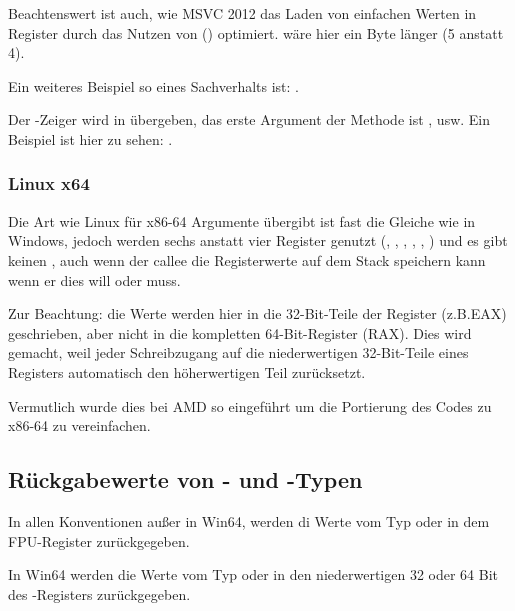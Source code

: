 Beachtenswert ist auch, wie MSVC 2012 das Laden von einfachen Werten in Register
durch das Nutzen von \LEA () optimiert.
 wäre hier ein Byte länger (5 anstatt 4).

Ein weiteres Beispiel so eines Sachverhalts ist: .


Der \ITthis-Zeiger wird in \RCX übergeben, das erste Argument der Methode ist \RDX, usw.
Ein Beispiel ist hier zu sehen: .

\subsubsection{Linux x64}

Die Art wie Linux für x86-64 Argumente übergibt ist fast die Gleiche wie in Windows,
jedoch werden sechs anstatt vier Register genutzt (\RDI, \RSI, \RDX, \RCX, , )
und es gibt keinen , auch wenn der \gls{callee} die Registerwerte auf
dem Stack speichern kann wenn er dies will oder muss.

%


Zur Beachtung: die Werte werden hier in die 32-Bit-Teile der Register (z.B.EAX) geschrieben,
aber nicht in die kompletten 64-Bit-Register (RAX).
Dies wird gemacht, weil jeder Schreibzugang auf die niederwertigen 32-Bit-Teile eines
Registers automatisch den höherwertigen Teil zurücksetzt.

Vermutlich wurde dies bei AMD so eingeführt um die Portierung des Codes zu x86-64 zu vereinfachen.

\subsection{Rückgabewerte von \Tfloat- und \Tdouble-Typen}

In allen Konventionen außer in Win64, werden di Werte vom Typ \Tfloat oder \Tdouble
in dem FPU-Register  zurückgegeben.

In Win64 werden die Werte vom Typ \Tfloat oder \Tdouble in den niederwertigen 32 oder
64 Bit des -Registers zurückgegeben.

